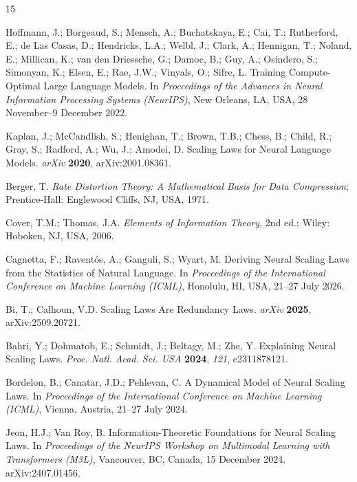 \documentclass[entropy,article,submit,moreauthors,pdftex]{Definitions/mdpi}
\begin{document}
\begin{thebibliography}{15}

Hoffmann, J.; Borgeaud, S.; Mensch, A.; Buchatskaya, E.; Cai, T.; Rutherford, E.; de Las Casas, D.; Hendricks, L.A.; Welbl, J.; Clark, A.; Hennigan, T.; Noland, E.; Millican, K.; van den Driessche, G.; Damoc, B.; Guy, A.; Osindero, S.; Simonyan, K.; Elsen, E.; Rae, J.W.; Vinyals, O.; Sifre, L. Training Compute-Optimal Large Language Models. In \textit{Proceedings of the Advances in Neural Information Processing Systems (NeurIPS)}, New Orleans, LA, USA, 28 November--9 December 2022.

Kaplan, J.; McCandlish, S.; Henighan, T.; Brown, T.B.; Chess, B.; Child, R.; Gray, S.; Radford, A.; Wu, J.; Amodei, D. Scaling Laws for Neural Language Models. \textit{arXiv} \textbf{2020}, arXiv:2001.08361.

Berger, T. \textit{Rate Distortion Theory: A Mathematical Basis for Data Compression}; Prentice-Hall: Englewood Cliffs, NJ, USA, 1971.

Cover, T.M.; Thomas, J.A. \textit{Elements of Information Theory}, 2nd ed.; Wiley: Hoboken, NJ, USA, 2006.

Cagnetta, F.; Ravent{\'o}s, A.; Ganguli, S.; Wyart, M. Deriving Neural Scaling Laws from the Statistics of Natural Language. In \textit{Proceedings of the International Conference on Machine Learning (ICML)}, Honolulu, HI, USA, 21--27 July 2026.

Bi, T.; Calhoun, V.D. Scaling Laws Are Redundancy Laws. \textit{arXiv} \textbf{2025}, arXiv:2509.20721.

Bahri, Y.; Dohmatob, E.; Schmidt, J.; Beltagy, M.; Zhe, Y. Explaining Neural Scaling Laws. \textit{Proc. Natl. Acad. Sci. USA} \textbf{2024}, \textit{121}, e2311878121.

Bordelon, B.; Canatar, J.D.; Pehlevan, C. A Dynamical Model of Neural Scaling Laws. In \textit{Proceedings of the International Conference on Machine Learning (ICML)}, Vienna, Austria, 21--27 July 2024.

Jeon, H.J.; Van Roy, B. Information-Theoretic Foundations for Neural Scaling Laws. In \textit{Proceedings of the NeurIPS Workshop on Multimodal Learning with Transformers (M3L)}, Vancouver, BC, Canada, 15 December 2024. arXiv:2407.01456.


\end{thebibliography}
\end{document}
